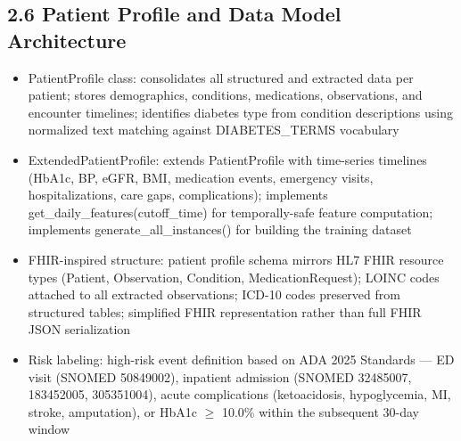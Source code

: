 \documentclass[11pt,a4paper]{article}
\begin{document}
\subsection{2.6 Patient Profile and Data Model Architecture}
\begin{itemize}
\item PatientProfile class: consolidates all structured and extracted data per patient; stores demographics, conditions, medications, observations, and encounter timelines; identifies diabetes type from condition descriptions using normalized text matching against DIABETES\_TERMS vocabulary
\item ExtendedPatientProfile: extends PatientProfile with time-series timelines (HbA1c, BP, eGFR, BMI, medication events, emergency visits, hospitalizations, care gaps, complications); implements get\_daily\_features(cutoff\_time) for temporally-safe feature computation; implements generate\_all\_instances() for building the training dataset
\item FHIR-inspired structure: patient profile schema mirrors HL7 FHIR resource types (Patient, Observation, Condition, MedicationRequest); LOINC codes attached to all extracted observations; ICD-10 codes preserved from structured tables; simplified FHIR representation rather than full FHIR JSON serialization
\item Risk labeling: high-risk event definition based on ADA 2025 Standards --- ED visit (SNOMED 50849002), inpatient admission (SNOMED 32485007, 183452005, 305351004), acute complications (ketoacidosis, hypoglycemia, MI, stroke, amputation), or HbA1c $\geq$ 10.0\% within the subsequent 30-day window
\end{itemize}
\end{document}
